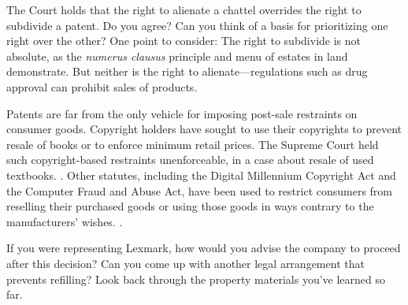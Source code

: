 The Court holds that the right to alienate a chattel overrides the right to
subdivide a patent. Do you agree? Can you think of a basis for prioritizing one
right over the other? One point to consider: The right to subdivide is not
absolute, as the \emph{numerus clausus} principle and menu of estates in land
demonstrate. But neither is the right to alienate---regulations such as drug
approval can prohibit sales of products.






\item Patents are far from the only vehicle for imposing post-sale restraints on
consumer goods. Copyright holders have sought to use their copyrights to prevent
resale of books or to enforce minimum retail prices. The Supreme Court held such
copyright-based restraints unenforceable, in a case about resale of used
textbooks. . Other statutes, including the Digital
Millennium Copyright Act and the Computer Fraud and Abuse Act, have been used to
restrict consumers from reselling their purchased goods or using those goods in
ways contrary to the manufacturers' wishes. .


\item If you were representing Lexmark, how would you advise the company to
proceed after this decision? Can you come up with another legal arrangement that
prevents refilling? Look back through the property materials you've learned so
far.
